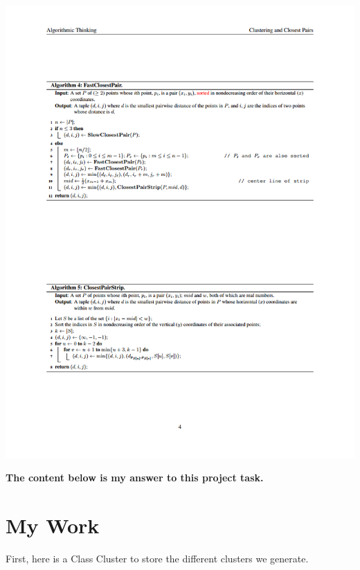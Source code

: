 \documentclass[11pt]{article}
\makeatletter
\def\maxwidth{\ifdim\Gin@nat@width>\linewidth\linewidth
    \else\Gin@nat@width\fi}
\let\Oldincludegraphics\includegraphics
\renewcommand{\includegraphics}[1]{\Oldincludegraphics[width=.8\maxwidth]{#1}}
\makeatother
\begin{document}
\includegraphics{img/cluster_4.png}

    \textbf{The content below is my answer to this project task.}

    \section{My Work}\label{my-work}

    First, here is a Class Cluster to store the different clusters we
generate.
\end{document}

